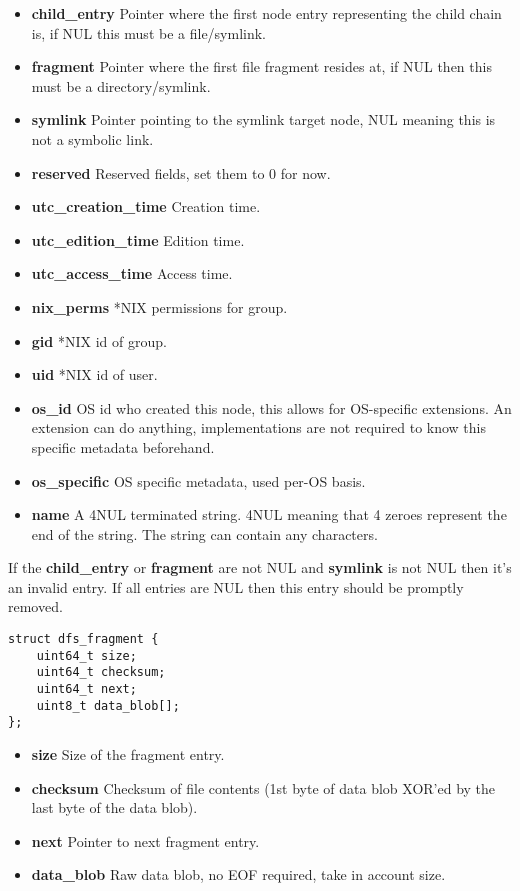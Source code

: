\documentclass[12pt]{article}
\begin{document}
\begin{itemize}
	\item \textbf{child\_entry} Pointer where the first node entry representing the child chain is, if NUL this must be a file/symlink.
	\item \textbf{fragment} Pointer where the first file fragment resides at, if NUL then this must be a directory/symlink.
	\item \textbf{symlink} Pointer pointing to the symlink target node, NUL meaning this is not a symbolic link.
	\item \textbf{reserved} Reserved fields, set them to 0 for now.
	\item \textbf{utc\_creation\_time} Creation time.
	\item \textbf{utc\_edition\_time} Edition time.
	\item \textbf{utc\_access\_time} Access time.
	\item \textbf{nix_perms} *NIX permissions for group.
	\item \textbf{gid} *NIX id of group.
	\item \textbf{uid} *NIX id of user.
	\item \textbf{os\_id} OS id who created this node, this allows for OS-specific extensions. An extension can do anything, implementations are not required to know this specific metadata beforehand.
	\item \textbf{os\_specific} OS specific metadata, used per-OS basis.
	\item \textbf{name} A 4NUL terminated string. 4NUL meaning that 4 zeroes represent the end of the string. The string can contain any characters.
\end{itemize}

If the \textbf{child\_entry} or \textbf{fragment} are not NUL and \textbf{symlink} is not NUL then it's an invalid entry. If all entries are NUL then this entry should be promptly removed.

\begin{verbatim}
struct dfs_fragment {
	uint64_t size;
	uint64_t checksum;
	uint64_t next;
	uint8_t data_blob[];
};
\end{verbatim}

\begin{itemize}
	\item \textbf{size} Size of the fragment entry.
	\item \textbf{checksum} Checksum of file contents (1st byte of data blob XOR'ed by the last byte of the data blob).
	\item \textbf{next} Pointer to next fragment entry.
	\item \textbf{data\_blob} Raw data blob, no EOF required, take in account size.
\end{itemize}
\end{document}
